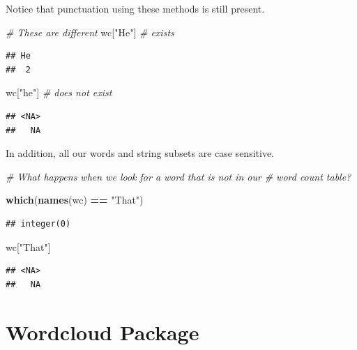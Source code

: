 \documentclass[
]{book}
\newenvironment{Shaded}{\begin{snugshade}}{\end{snugshade}}
\newcommand{\CommentTok}[1]{\textcolor[rgb]{0.56,0.35,0.01}{\textit{#1}}}
\newcommand{\KeywordTok}[1]{\textcolor[rgb]{0.13,0.29,0.53}{\textbf{#1}}}
\newcommand{\NormalTok}[1]{#1}
\newcommand{\OperatorTok}[1]{\textcolor[rgb]{0.81,0.36,0.00}{\textbf{#1}}}
\newcommand{\StringTok}[1]{\textcolor[rgb]{0.31,0.60,0.02}{#1}}
\begin{document}
Notice that punctuation using these methods is still present.

\begin{Shaded}
\begin{Highlighting}[]
\CommentTok{# These are different}
\NormalTok{wc[}\StringTok{"He"}\NormalTok{]  }\CommentTok{# exists}
\end{Highlighting}
\end{Shaded}

\begin{verbatim}
## He 
##  2
\end{verbatim}

\begin{Shaded}
\begin{Highlighting}[]
\NormalTok{wc[}\StringTok{"he"}\NormalTok{]  }\CommentTok{# does not exist}
\end{Highlighting}
\end{Shaded}

\begin{verbatim}
## <NA> 
##   NA
\end{verbatim}

In addition, all our words and string subsets are case sensitive.

\begin{Shaded}
\begin{Highlighting}[]
\CommentTok{# What happens when we look for a word that is not in our}
\CommentTok{# word count table?}

\KeywordTok{which}\NormalTok{(}\KeywordTok{names}\NormalTok{(wc) }\OperatorTok{==}\StringTok{ "That"}\NormalTok{)}
\end{Highlighting}
\end{Shaded}

\begin{verbatim}
## integer(0)
\end{verbatim}

\begin{Shaded}
\begin{Highlighting}[]
\NormalTok{wc[}\StringTok{"That"}\NormalTok{]}
\end{Highlighting}
\end{Shaded}

\begin{verbatim}
## <NA> 
##   NA
\end{verbatim}

\hypertarget{wordcloud-package}{%
\section{Wordcloud Package}\label{wordcloud-package}}
\end{document}
